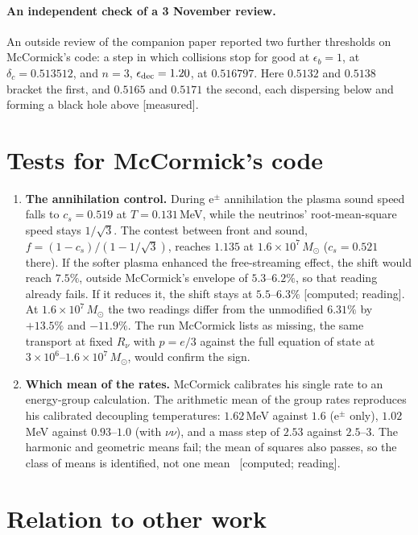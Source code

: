 \documentclass[11pt]{article}
\newcommand{\grade}[1]{\textsf{\small[#1]}}
\begin{document}
\paragraph{An independent check of a 3 November review.} An outside review of the companion paper reported two further thresholds on McCormick's code: a step in which collisions stop for good at $\epsilon_b=1$, at $\delta_c=0.513512$, and $n=3$, $\epsilon_{\rm dec}=1.20$, at $0.516797$. Here $0.5132$ and $0.5138$ bracket the first, and $0.5165$ and $0.5171$ the second, each dispersing below and forming a black hole above \grade{measured}.

\section{Tests for McCormick's code}

\begin{enumerate}
\item \textbf{The annihilation control.} During e$^\pm$ annihilation the plasma sound speed falls to $c_s=0.519$ at $T=0.131$\,MeV, while the neutrinos' root-mean-square speed stays $1/\sqrt3$. The contest between front and sound, $f=(1-c_s)/(1-1/\sqrt3)$, reaches $1.135$ at $1.6\times10^7\,M_\odot$ ($c_s=0.521$ there). If the softer plasma enhanced the free-streaming effect, the shift would reach $7.5\%$, outside McCormick's envelope of $5.3$--$6.2\%$, so that reading already fails. If it reduces it, the shift stays at $5.5$--$6.3\%$ \grade{computed; reading}. At $1.6\times10^7\,M_\odot$ the two readings differ from the unmodified $6.31\%$ by $+13.5\%$ and $-11.9\%$. The run McCormick lists as missing, the same transport at fixed $R_\nu$ with $p=e/3$ against the full equation of state at $3\times10^6$--$1.6\times10^7\,M_\odot$, would confirm the sign.
\item \textbf{Which mean of the rates.} McCormick calibrates his single rate to an energy-group calculation. The arithmetic mean of the group rates reproduces his calibrated decoupling temperatures: $1.62$\,MeV against $1.6$ (e$^\pm$ only), $1.02$\,MeV against $0.93$--$1.0$ (with $\nu\nu$), and a mass step of $2.53$ against $2.5$--$3$. The harmonic and geometric means fail; the mean of squares also passes, so the class of means is identified, not one mean~\cite{WB} \grade{computed; reading}.
\end{enumerate}

\section{Relation to other work}
\end{document}
